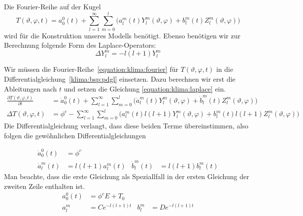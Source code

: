 \begin{refsection}
Die Fourier-Reihe auf der Kugel
\begin{equation}
T(\vartheta ,\varphi ,t)
=
a^0_0(t) + \sum_{l=1}^\infty\sum_{m=0}^l \bigl( a^m_l(t)Y^m_l(\vartheta ,\varphi)+b^m_l(t)Z^m_l(\vartheta ,\varphi)\bigr)
\label{equation:klima:fourier}
\end{equation}
wird für die Konstruktion unseres Modells benötigt. Ebenso benötigen wir zur Berechnung folgende Form des Laplace-Operators:
\begin{equation}
\Delta Y^m_l=-l(l+1)Y^m_l
\label{equation:klima:laplace}
\end{equation}

Wir müssen die Fourier-Reihe~\eqref{equation:klima:fourier} für
$T(\vartheta ,\varphi ,t)$ in die Differentialgleichung~\eqref{klima:bsp:pdgl}
einsetzen.
Dazu berechnen wir erst die Ableitungen nach $t$ und setzen die Gleichung \eqref{equation:klima:laplace} ein.
\begin{align*}
\frac{\partial T(\vartheta ,\varphi ,t)}{\partial t} &=
\dot{a}^0_0(t)+\sum_{l=1}^\infty\sum_{m=0}^l \bigl( \dot{a}^m_l(t)Y^m_l(\vartheta ,\varphi)+\dot{b}^m_l(t)Z^m_l(\vartheta ,\varphi)\bigr)
\\
\Delta T(\vartheta ,\varphi ,t) &=
\phi^c - \sum_{l=1}^\infty\sum_{m=0}^l \bigl( a^m_l(t)l(l+1)Y^m_l(\vartheta ,\varphi)+b^m_l(t)l(l+1)Z^m_l(\vartheta ,\varphi)\bigr)
\end{align*}
Die Differentialgleichung verlangt, dass diese beiden Terme übereinstimmen, also folgen die gewöhnlichen Differentialgleichungen

\begin{align*}
\dot a^0_0(t)&=\phi^c
\\
\dot a^m_l(t)&=l(l+1)a^m_l(t)&
\dot b^m_l(t)&=l(l+1)b^m_l(t)
\end{align*}
Man beachte, dass die erste Gleichung als Speziallfall in der ersten
Gleichung der zweiten Zeile enthalten ist.
\begin{align*}
a^0_0(t)&=\phi^cE+T_0
\\
a^m_l &=Ce^{-l(l+1)t}&
b^m_l &=De^{-l(l+1)t}
\end{align*}



\end{refsection}
